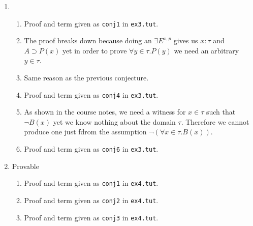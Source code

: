 \documentclass{article}
\newcommand{\D}{\mathcal{D}}
\newcommand{\E}{\mathcal{E}}
\newcommand{\then}{\supset}
\newcommand{\proves}{\vdash}
\newcommand{\GV}{\Gamma \proves}
\begin{document}
\begin{enumerate}[label=\textbf{Exercise \arabic*}]
\begin{itemize}
\item case
\begin{tabular}{cc}
$\D = \infer[\then I^u]
  {\GV \lambda u \in A_1 . M : A_1 \then B_1}
  {\deduce{\Gamma,u:A_1 \proves M:B_1}{\E}}$
&
$\D' = \infer[\then I^u]
  {\GV \lambda u \in A_2 . M : A_2 \then B_2}
  {\deduce{\Gamma,u:A_2 \proves M:B_2}{\E'}}$
\end{tabular}
\begin{align*}
A_1 &= A_2 && \text{by IH on $\E$ and $\E'$} \\
B_1 &= B_2 && \text{by IH on $\E$ and $\E'$} \\
\Gamma,u:A_1 &\proves M:B_1 && \text{by $\then I$ on $\E'$} \\
A_1 \then B_1 &= A_2 \then B_2 && \text{because we derived $A_1 \then B_1$ from $\E'$}
\end{align*}

The other cases follow a very similar argument.
\end{itemize}

\item

\begin{enumerate}[label=\arabic*.,leftmargin=1em]
\item Proof and term given as \texttt{conj1} in \texttt{ex3.tut}.
\item The proof breaks down because doing an $\exists E^{x,p}$ gives us $x:\tau$ and $A\then P(x)$ yet in order to prove $\forall y\in\tau.P(y)$ we need an arbitrary $y\in\tau$.
\item Same reason as the previous conjecture.
\item Proof and term given as \texttt{conj4} in \texttt{ex3.tut}.
\item As shown in the course notes, we need a witness for $x\in\tau$ such that $\neg B(x)$ yet we know nothing about the domain $\tau$. Therefore we cannot produce one just fdrom the assumption $\neg(\forall x\in\tau.B(x))$.
\item Proof and term given as \texttt{conj6} in \texttt{ex3.tut}.
\end{enumerate}

\item Provable
\begin{enumerate}[label=\arabic*.,leftmargin=1em]
\item Proof and term given as \texttt{conj1} in \texttt{ex4.tut}.
\item Proof and term given as \texttt{conj2} in \texttt{ex4.tut}.
\item Proof and term given as \texttt{conj3} in \texttt{ex4.tut}.
\end{enumerate}

\end{enumerate}
\end{document}
